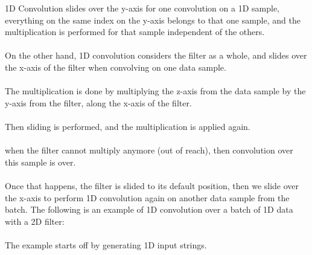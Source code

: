 \documentclass[12pt]{article}
\newcommand\tab[1][1cm]{\hspace*{#1}}
\begin{document}
1D Convolution slides over the y-axis for one convolution on a 1D sample, everything on the same index on the y-axis belongs to that one sample, and the multiplication is performed for that sample independent of the others.\\\\
On the other hand, 1D convolution considers the filter as a whole, and slides over the x-axis of the filter when convolving on one data sample.\\\\
The multiplication is done by multiplying the z-axis from the data sample by the y-axis from the filter, along the x-axis of the filter.\\\\
Then sliding is performed, and the multiplication is applied again.\\\\
when the filter cannot multiply anymore (out of reach), then convolution over this sample is over.\\\\
Once that happens, the filter is slided to its default position, then we slide over the x-axis to perform 1D convolution again on another data sample from the batch.
\newpage
The following is an example of 1D convolution over a batch of 1D data with a 2D filter:\\\\
\tab The example starts off by generating 1D input strings.\\
\end{document}

